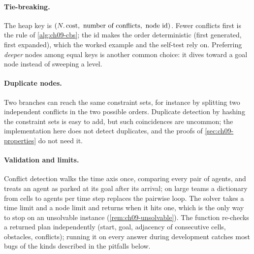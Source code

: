 \paragraph{Tie-breaking.} The heap key is
$(N.\operatorname{cost},\ \text{number of conflicts},\ \text{node id})$. Fewer conflicts
first is the rule of \cref{alg:ch09-cbs}; the id makes the order
deterministic (first generated, first expanded), which the worked example
and the self-test rely on. Preferring \emph{deeper} nodes among equal keys
is another common choice: it dives toward a goal node instead of sweeping
a level.

\paragraph{Duplicate nodes.} Two branches can reach the same constraint
sets, for instance by splitting two independent conflicts in the two
possible orders. Duplicate detection by hashing the constraint sets is easy
to add, but such coincidences are uncommon; the implementation here does not
detect duplicates, and the
proofs of \cref{sec:ch09-properties} do not need it.

\paragraph{Validation and limits.} Conflict detection walks the time axis
once, comparing every pair of agents, and treats an agent as parked at its
goal after its arrival; on large teams a dictionary from cells to agents per
time step replaces the pairwise loop. The solver takes a time limit and a
node limit and returns  when it hits one, which is the only way
to stop on an unsolvable instance (\cref{rem:ch09-unsolvable}). The
function  re-checks a returned plan independently (start,
goal, adjacency of consecutive cells, obstacles, conflicts); running it on
every answer during development catches most bugs of the kinds described in
the pitfalls below.


